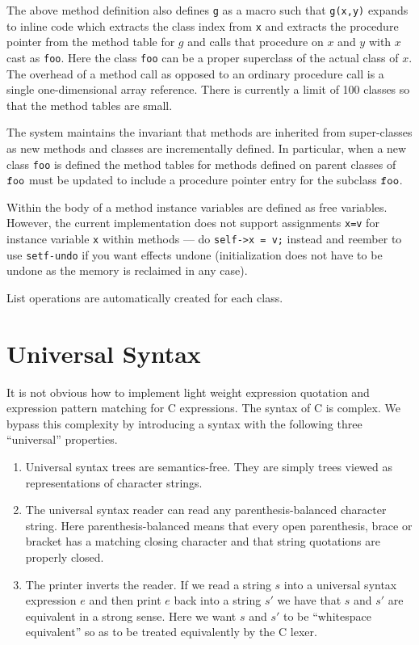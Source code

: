 \documentclass{article}
\begin{document}
The above method definition also defines {\tt g} as a macro such that {\tt g(x,y)} expands to inline code
which extracts the class index from {\tt x} and extracts the procedure pointer from the method table for $g$
and calls that procedure on $x$ and $y$ with $x$ cast as {\tt foo}.  Here the class {\tt foo} can be a proper
superclass of the actual class of $x$.  The overhead of a method call as opposed to an ordinary procedure call is a single one-dimensional
array reference.  There is currently a limit of 100 classes so that the method tables are small.

The system maintains the invariant that methods are inherited from super-classes as new methods and classes are incrementally defined.
In particular, when a new class {\tt foo} is defined
the method tables for methods defined on parent classes of ${\tt foo}$ must be updated to include a procedure pointer entry for the subclass ${\tt foo}$.

Within the body of a method instance variables are defined as free variables.
However, the current implementation does not support assignments {\tt x=v} for instance variable {\tt x} within methods --- do {\tt self->x = v;} instead
and reember to use {\tt setf-undo} if you want effects undone (initialization does not have to be undone as the memory is reclaimed in any case).

List operations are automatically created for each class.

\section{Universal Syntax}

It is not obvious how to implement light weight expression quotation and expression pattern matching for C expressions.  The syntax of C is complex.
We bypass this complexity by introducing a syntax with the following three ``universal'' properties.

\begin{enumerate}
\item Universal syntax trees are semantics-free.  They are simply trees viewed as representations of character strings.

\item The universal syntax reader can read any parenthesis-balanced character string.
  Here parenthesis-balanced means that every open parenthesis, brace or bracket has a matching closing character and that string quotations
  are properly closed.
  
\item The printer inverts the reader. If we read a string $s$ into a universal syntax expression
  $e$ and then print $e$ back into a string $s'$ we have that $s$ and $s'$ are equivalent in a strong sense.  Here we want
  $s$ and $s'$ to be ``whitespace equivalent'' so as to be treated equivalently by the C lexer.
\end{enumerate}
\end{document}
